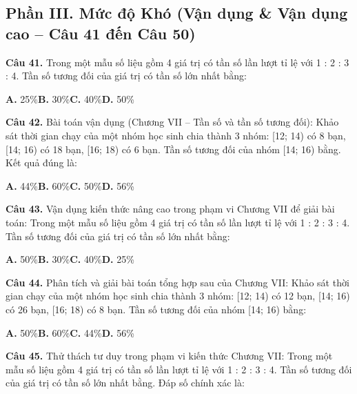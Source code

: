 \documentclass[11pt,a4paper]{article}
\begin{document}
\subsection*{\color{accent} Phần III. Mức độ Khó (Vận dụng \& Vận dụng cao -- Câu 41 đến Câu 50)}
\textbf{\color{primary} Câu 41.} Trong một mẫu số liệu gồm 4 giá trị có tần số lần lượt tỉ lệ với 1 : 2 : 3 : 4. Tần số tương đối của giá trị có tần số lớn nhất bằng:\par
\hspace*{1.5em}\textbf{A.} 25\%\quad\quad \textbf{B.} 30\%\quad\quad \textbf{C.} 40\%\quad\quad \textbf{D.} 50\%\par\vspace{2pt}
\textbf{\color{primary} Câu 42.} Bài toán vận dụng (Chương VII – Tần số và tần số tương đối): Khảo sát thời gian chạy của một nhóm học sinh chia thành 3 nhóm: [12; 14) có 8 bạn, [14; 16) có 18 bạn, [16; 18) có 6 bạn. Tần số tương đối của nhóm [14; 16) bằng. Kết quả đúng là:\par
\hspace*{1.5em}\textbf{A.} 44\%\quad\quad \textbf{B.} 60\%\quad\quad \textbf{C.} 50\%\quad\quad \textbf{D.} 56\%\par\vspace{2pt}
\textbf{\color{primary} Câu 43.} Vận dụng kiến thức nâng cao trong phạm vi Chương VII để giải bài toán: Trong một mẫu số liệu gồm 4 giá trị có tần số lần lượt tỉ lệ với 1 : 2 : 3 : 4. Tần số tương đối của giá trị có tần số lớn nhất bằng:\par
\hspace*{1.5em}\textbf{A.} 50\%\quad\quad \textbf{B.} 30\%\quad\quad \textbf{C.} 40\%\quad\quad \textbf{D.} 25\%\par\vspace{2pt}
\textbf{\color{primary} Câu 44.} Phân tích và giải bài toán tổng hợp sau của Chương VII: Khảo sát thời gian chạy của một nhóm học sinh chia thành 3 nhóm: [12; 14) có 12 bạn, [14; 16) có 26 bạn, [16; 18) có 8 bạn. Tần số tương đối của nhóm [14; 16) bằng:\par
\hspace*{1.5em}\textbf{A.} 50\%\quad\quad \textbf{B.} 60\%\quad\quad \textbf{C.} 44\%\quad\quad \textbf{D.} 56\%\par\vspace{2pt}
\textbf{\color{primary} Câu 45.} Thử thách tư duy trong phạm vi kiến thức Chương VII: Trong một mẫu số liệu gồm 4 giá trị có tần số lần lượt tỉ lệ với 1 : 2 : 3 : 4. Tần số tương đối của giá trị có tần số lớn nhất bằng. Đáp số chính xác là:\par
\end{document}
